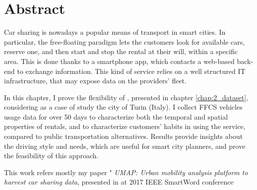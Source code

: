 \section{Abstract}
Car sharing is nowadays a popular means of transport in smart cities. In particular, the free-floating paradigm lets the customers look for available cars, reserve one, and then start and stop the rental at their will, within a specific area. This is done thanks to a smartphone app, which contacts a web-based back-end to exchange information.  This kind of service relies on a well structured IT infrastructure, that may expose data on the providers' fleet.

In this chapter, I prove the flexibility of \tool, presented in chapter \ref{chap:2_dataset}, considering as  a case of study the city of Turin (Italy). I collect FFCS vehicles usage data for over 50 days to characterize both the temporal and spatial properties of rentals, and to characterize customers' habits in using the service, compared to public transportation  alternatives. Results provide insights about the driving style and needs, which are useful for smart city planners, and prove the feasibility of this approach.

This work refers mostly my paper " \textit{UMAP: Urban mobility analysis platform to harvest car sharing data}, presented in at 2017 IEEE SmartWord conference \cite{ciociolaumap}

